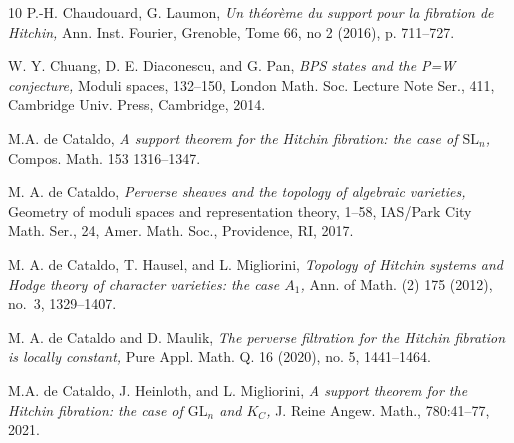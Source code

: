 \documentclass[11pt]{amsart}
\theoremstyle{plain}
\theoremstyle{definition}
\theoremstyle{remark}
\begin{document}
\begin{thebibliography}{10}
 P.-H. Chaudouard, G. Laumon, {\em Un th\'{e}or\`{e}me du support pour la fibration de Hitchin,} Ann. Inst. Fourier, Grenoble, Tome 66, no 2 (2016), p. 711--727.

 W. Y. Chuang, D. E. Diaconescu, and G. Pan, {\em BPS states and the P=W conjecture,} Moduli spaces, 132--150, London Math. Soc. Lecture Note Ser., 411, Cambridge Univ. Press, Cambridge, 2014.



 M.A. de Cataldo, {\em A support theorem for the Hitchin fibration: the case of $\mathrm{SL}_n$,} Compos. Math. 153 1316--1347.

  M. A. de Cataldo, {\em Perverse sheaves and the topology of algebraic varieties,} Geometry of moduli spaces and representation theory, 1--58, IAS/Park City Math. Ser., 24, Amer. Math. Soc., Providence, RI, 2017. 






 M. A. de Cataldo, T. Hausel, and L. Migliorini, {\em Topology of Hitchin systems and Hodge theory of character varieties: the case $A_1$,} Ann. of Math. (2) 175 (2012), no.~3, 1329--1407.


 M. A. de Cataldo and D. Maulik, {\em The perverse filtration for the Hitchin fibration is locally constant,} Pure Appl. Math. Q. 16 (2020), no. 5, 1441--1464.



 M.A. de Cataldo, J. Heinloth, and L. Migliorini, {\em A support theorem for the Hitchin fibration: the case of $\mathrm{GL}_n$
and $K_C$,} J. Reine Angew. Math., 780:41--77, 2021.




\end{thebibliography}
\end{document}
